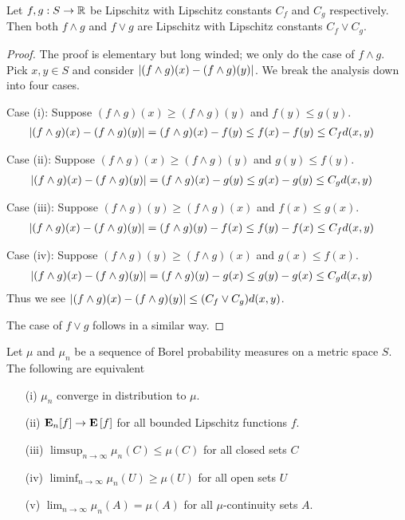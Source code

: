 \begin{lem}\label{MaxMinOfLipschitz}Let $f,g : S \to \reals$ be Lipschitz with Lipschitz
  constants $C_f$ and $C_g$ respectively.  Then both $f \wedge g$
  and $f \vee g$ are Lipschitz with Lipschitz constants $C_f \vee C_g$.
\end{lem}
\begin{proof}
The proof is elementary but long winded; we only do the case of $f
\wedge g$.  Pick $x,y \in S$ and
consider $\abs{(f \wedge g)(x) - (f \wedge g)(y)}$.  We break the analysis
down into four cases.  

Case (i): Suppose $(f \wedge g)(x) \geq (f \wedge g)(y)$ and $f(y) \leq g(y)$.
\begin{align*}
\abs{(f \wedge g)(x) - (f \wedge g)(y)} &= (f \wedge g)(x) - f(y) \leq
f(x) - f(y) \leq C_f d(x,y)
\end{align*}

Case (ii): Suppose $(f \wedge g)(x) \geq (f \wedge g)(y)$ and $g(y) \leq f(y)$.
\begin{align*}
\abs{(f \wedge g)(x) - (f \wedge g)(y)} &= (f \wedge g)(x) - g(y) \leq
g(x) - g(y) \leq C_g d(x,y)
\end{align*}

Case (iii): Suppose $(f \wedge g)(y) \geq (f \wedge g)(x)$ and $f(x) \leq g(x)$.
\begin{align*}
\abs{(f \wedge g)(x) - (f \wedge g)(y)} &= (f \wedge g)(y) - f(x) \leq
f(y) - f(x) \leq C_f d(x,y)
\end{align*}

Case (iv): Suppose $(f \wedge g)(y) \geq (f \wedge g)(x)$ and $g(x) \leq f(x)$.
\begin{align*}
\abs{(f \wedge g)(x) - (f \wedge g)(y)} &= (f \wedge g)(y) - g(x) \leq
g(y) - g(x) \leq C_g d(x,y)
\end{align*}
Thus we see $\abs{(f \wedge g)(x) - (f \wedge g)(y)} \leq (C_f \vee
C_g) d(x,y)$.

The case of $f \vee g$ follows in a similar way.
\end{proof}

\begin{thm}\label{PortmanteauTheorem}Let $\mu$ and $\mu_n$ be a sequence of
 Borel probability measures on a metric space $S$.  The following are equivalent
\begin{itemize}
\item[(i)] $\mu_n$ converge in distribution to $\mu$.
\item[(ii)] $\sexpectation{f}{n} \to \expectation{f}$
  for all bounded Lipschitz functions $f$.
\item[(iii)] $\limsup_{n \to \infty} \mu_n(C) \leq
  \mu(C)$ for all closed sets $C$
\item[(iv)] $\liminf_{n \to \infty} \mu_n(U) \geq
  \mu(U)$ for all open sets $U$
\item[(v)] $\lim_{n \to \infty} \mu_n(A) = \mu(A)$ for all
  $\mu$-continuity sets $A$.
\end{itemize}
\end{thm}

